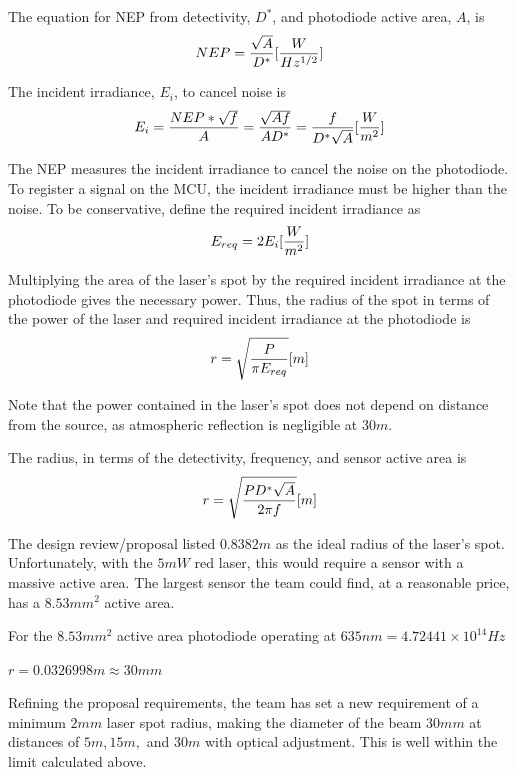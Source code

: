 \documentclass[letterpaper,10pt]{article}
\begin{document}
\begin{spacing}{1.15}
The equation for NEP from detectivity, $D^*$, and photodiode active area, $A$,  is 
\begin{equation} \large 
	NEP = \frac{\sqrt{A}}{D^*}  [\frac{W}{Hz^{1/2}}]
\end{equation}

The incident irradiance, $E_i$, to cancel noise is
\begin{equation} \large 
	E_i = \frac{NEP * \sqrt{f}}{A} = \frac{\sqrt{Af}}{AD^*} = \frac{f}{D^*\sqrt{A}} [\frac{W}{m^{2}}]
\end{equation}

The NEP measures the incident irradiance to cancel the noise on the photodiode. To register a signal on the MCU, the incident irradiance must be higher than the noise. To be conservative, define the required incident irradiance as 
\begin{equation} \large 
	E_{req} = 2E_i [\frac{W}{m^{2}}]
\end{equation}

Multiplying the area of the laser's spot by the required incident irradiance at the photodiode gives the necessary power. Thus, the radius of the spot in terms of the power of the laser and required incident irradiance at the photodiode is 
\begin{equation} \large 
	r = \sqrt{\frac{P}{\pi E_{req}}} [m]
\end{equation}

Note that the power contained in the laser's spot does not depend on distance from the source, as atmospheric reflection is negligible at $30 m$.

The radius, in terms of the detectivity, frequency, and sensor active area is
\begin{equation}\large 
	r = \sqrt{\frac{PD^*\sqrt{A}}{2 \pi f}} [m]
\end{equation}

The design review/proposal listed $0.8382 m$ as the ideal radius of the laser's spot. Unfortunately, with the $5mW$ red laser, this would require a sensor with a massive active area. The largest sensor the team could find, at a reasonable price, has a $8.53 mm^2$ active area. 

For the $8.53 mm^2$ active area photodiode operating at $635 nm = 4.72441 × 10^{14} Hz$ 
\begin{center} \large
	$r = 0.0326998 m \approx 30mm$
\end{center}

Refining the proposal requirements, the team has set a new requirement of a minimum $2 mm$ laser spot radius, making the diameter of the beam $30mm$ at distances of $5m, 15m,$ and $30m$ with optical adjustment. This is well within the limit calculated above. 






\end{spacing}
\end{document}
